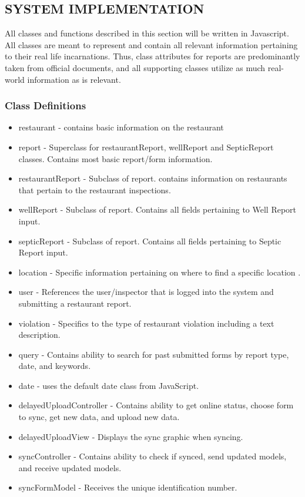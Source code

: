 \documentclass[twoside,letterpaper]{article}
\begin{document}
\subsection[SYSTEM IMPLEMENTATION]{\rmfamily\bfseries\color{black}
SYSTEM IMPLEMENTATION}
{\rmfamily\color{black}
All classes and functions described in this section will be written in Javascript. All classes are meant to represent and contain all relevant information pertaining to their real life incarnations. Thus, class attributes for reports are predominantly taken from official documents, and all supporting classes utilize as much real-world information as is relevant.
\subsubsection{Class Definitions}
\begin{itemize}
\item restaurant - contains basic information on the restaurant
\item report - Superclass for restaurantReport, wellReport and SepticReport classes. Contains most basic report/form information.
\item restaurantReport - Subclass of report. contains information on restaurants that pertain to the restaurant inspections.
\item wellReport -  Subclass of report. Contains all fields pertaining to Well Report input.
\item septicReport - Subclass of report. Contains all fields pertaining to Septic Report input.
\item location - Specific information pertaining on where to find a specific location .
\item user - References the user/inspector that is logged into the system and submitting a restaurant report.
\item violation - Specifics to the type of restaurant violation including a text description.
\item query - Contains ability to search for past submitted forms by report type, date, and keywords.
\item date - uses the default date class from JavaScript.
\item delayedUploadController - Contains ability to get online status, choose form to sync, get new data, and upload new data.
\item delayedUploadView - Displays the sync graphic when syncing.
\item syncController - Contains ability to check if synced, send updated models, and receive updated models.
\item syncFormModel - Receives the unique identification number.
\end{itemize}
}
\end{document}
